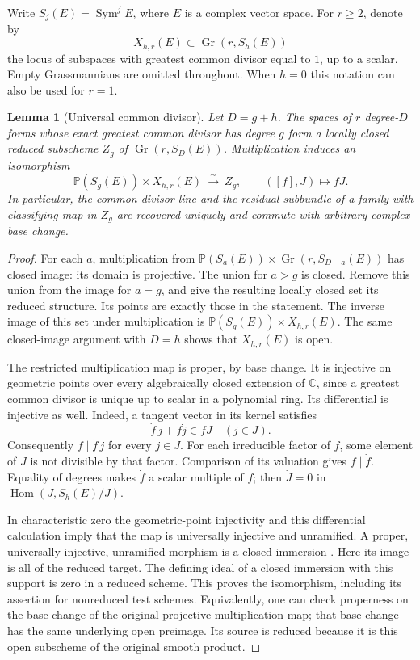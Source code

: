 \documentclass[11pt,reqno]{amsart}
\numberwithin{equation}{section}
\newtheorem{lemma}[theorem]{Lemma}
\theoremstyle{definition}\newtheorem{definition}[theorem]{Definition}
\theoremstyle{remark}\newtheorem{remark}[theorem]{Remark}
\newcommand{\C}{\mathbb C}\newcommand{\Q}{\mathbb Q}
\newcommand{\Pj}{\mathbb P}\newcommand{\A}{\mathbb A}
\DeclareMathOperator{\Sym}{Sym}\DeclareMathOperator{\Gr}{Gr}
\DeclareMathOperator{\Hom}{Hom}\DeclareMathOperator{\Tot}{Tot}
\begin{document}
Write \(S_j(E)=\Sym^j E\), where \(E\) is a complex vector space.
For \(r\ge2\), denote by
\[
 X_{h,r}(E)\subset\Gr(r,S_h(E))
\]
the locus of subspaces with greatest common divisor equal to \(1\),
up to a scalar.  Empty Grassmannians are omitted throughout.  When
\(h=0\) this notation can also be used for \(r=1\).

\begin{lemma}[Universal common divisor]\label{lem:universal-gcd}
Let \(D=g+h\).  The spaces of \(r\) degree-\(D\) forms whose exact
greatest common divisor has degree \(g\) form a locally closed
reduced subscheme \(Z_g\) of \(\Gr(r,S_D(E))\).  Multiplication
induces an isomorphism
\begin{equation}\label{eq:universal-gcd}
 \Pj(S_g(E))\times X_{h,r}(E)\ \xrightarrow{\ \sim\ }\ Z_g,
                 \qquad ([f],J)\longmapsto fJ.
\end{equation}
In particular, the common-divisor line and the residual subbundle of
a family with classifying map in \(Z_g\) are recovered uniquely and
commute with arbitrary complex base change.
\end{lemma}
\begin{proof}
For each \(a\), multiplication from
\(\Pj(S_a(E))\times\Gr(r,S_{D-a}(E))\) has closed image: its domain
is projective.  The union for \(a>g\) is closed.  Remove this union
from the image for \(a=g\), and give the resulting locally closed
set its reduced structure.  Its points are exactly those in the
statement.  The inverse image of this set under multiplication is
\(\Pj(S_g(E))\times X_{h,r}(E)\).  The same closed-image argument
with \(D=h\) shows that \(X_{h,r}(E)\) is open.

The restricted multiplication map is proper, by base change.  It
is injective on geometric points over every algebraically closed
extension of \(\C\), since a greatest common divisor is unique up
to scalar in a polynomial ring.  Its differential is injective as
well.  Indeed, a tangent vector in its kernel satisfies
\[
                   \dot f\, j+f\dot j\in fJ\quad(j\in J).
\]
Consequently \(f\mid\dot f\,j\) for every \(j\in J\).  For each
irreducible factor of \(f\), some element of \(J\) is not divisible
by that factor.  Comparison of its valuation gives
\(f\mid\dot f\).  Equality of degrees makes \(\dot f\) a scalar
multiple of \(f\); then \(\dot J=0\) in
\(\Hom(J,S_h(E)/J)\).

In characteristic zero the geometric-point injectivity and this
differential calculation imply that the map is universally
injective and unramified.  A proper, universally injective,
unramified morphism is a closed immersion
\cite[Lemma~41.7.2]{StacksClosedImmersion}.
Here its image is all of the reduced target.  The defining ideal
of a closed immersion with this support is zero in a reduced
scheme.  This proves the isomorphism, including its assertion for
nonreduced test schemes.  Equivalently, one can check properness
on the base change of the original projective multiplication map;
that base change has the same underlying open preimage.  Its source
is reduced because it is this open subscheme of the original
smooth product.
\end{proof}
\end{document}
